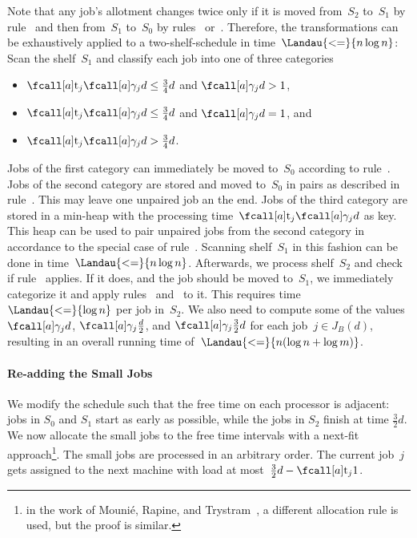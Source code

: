 Note that any job's allotment changes twice only if it is moved from~$S_2$ to~$S_1$ by rule~
and then from~$S_1$ to~$S_0$ by rules~ or~.
Therefore, the transformations can be exhaustively applied to a two-shelf-schedule in time~$\Landau{<=}{n \log n}$:
Scan the shelf~$S_1$ and classify each job into one of three categories
\begin{itemize}
  \item $\ptm{j}{\procnum{j}{d}} \leq \frac{3}{4} d$ and $\procnum{j}{d} > 1$,
  \item $\ptm{j}{\procnum{j}{d}} \leq \frac{3}{4} d$ and $\procnum{j}{d} = 1$, and
  \item $\ptm{j}{\procnum{j}{d}} > \frac{3}{4} d$.
\end{itemize}
Jobs of the first category can immediately be moved to~$S_0$ according to rule~.
Jobs of the second category are stored and moved to~$S_0$ in pairs as described in rule~.
This may leave one unpaired job an the end.
Jobs of the third category are stored in a min-heap with the processing time~$\ptm{j}{\procnum{j}{d}}$ as key.
This heap can be used to pair unpaired jobs from the second category
in accordance to the special case of rule~.
Scanning shelf~$S_1$ in this fashion can be done in time~$\Landau{<=}{n \log n}$.
Afterwards, we process shelf~$S_2$ and check if rule~ applies.
If it does, and the job should be moved to~$S_1$, we immediately categorize it
and apply rules~ and~ to it.
This requires time~$\Landau{<=}{\log n}$ per job in~$S_2$.
We also need to compute some of the values $\procnum{j}{d}$, $\procnum{j}{\frac{d}{2}}$,
and $\procnum{j}{\frac{3}{2}d}$ for each job~$j \in J_B(d)$,
resulting in an overall running time of~$\Landau{<=}{n (\log n + \log m)}$.


\paragraph{Re-adding the Small Jobs}

We modify the schedule such that the free time on each processor is adjacent:
jobs in $S_0$ and $S_1$ start as early as possible, while the jobs in $S_2$ finish at time $\frac{3}{2} d$.
We now allocate the small jobs to the free time intervals with a next-fit approach\footnote{in the work of Mounié, Rapine, and Trystram~\cite{mounie07}, a different allocation rule is used,
but the proof is similar.}.
The small jobs are processed in an arbitrary order.
The current job~$j$ gets assigned to the next machine with load at most~$\frac{3}{2}d-\ptm{j}{1}$.

